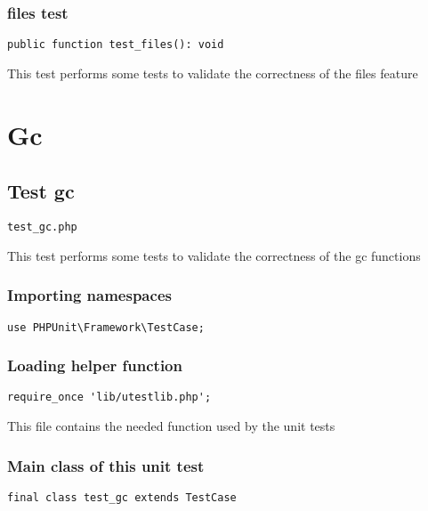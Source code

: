 \documentclass[a4paper]{article}
\begin{document}
\subsubsection{files test}

\begin{lstlisting}
public function test_files(): void
\end{lstlisting}

This test performs some tests to validate the correctness
of the files feature


\hypertarget{toc201}{}
\section{Gc}

\hypertarget{toc202}{}
\subsection{Test gc}

\begin{lstlisting}
test_gc.php
\end{lstlisting}

This test performs some tests to validate the correctness
of the gc functions

\hypertarget{toc203}{}
\subsubsection{Importing namespaces}

\begin{lstlisting}
use PHPUnit\Framework\TestCase;
\end{lstlisting}

\hypertarget{toc204}{}
\subsubsection{Loading helper function}

\begin{lstlisting}
require_once 'lib/utestlib.php';
\end{lstlisting}

This file contains the needed function used by the unit tests

\hypertarget{toc205}{}
\subsubsection{Main class of this unit test}

\begin{lstlisting}
final class test_gc extends TestCase
\end{lstlisting}
\end{document}
